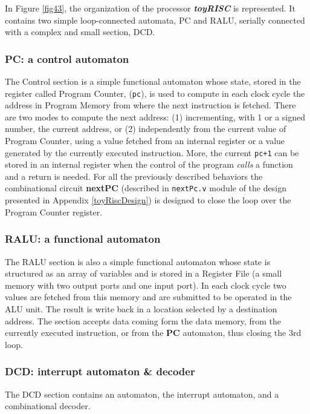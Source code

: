 In Figure \ref{fig43}, the organization of the processor {\bf {\em toyRISC}} is represented. It contains two simple loop-connected automata, PC and RALU, serially connected with a complex and small section, DCD.



\subsubsection{PC: a control automaton}

The Control section is a simple functional automaton whose
state, stored in the register called Program Counter, ({\tt pc}), is used
to compute in each clock cycle the address in Program Memory from where the next
instruction is fetched. There are two modes to compute the next
address: (1) incrementing, with 1 or a signed number, the current
address, or (2) independently from the
current value of Program Counter, using a value fetched from an internal
register or a value generated by the currently executed
instruction.  More,
the current {\tt pc+1} can be stored in an internal register when
the control of the program {\em calls} a  function and a return is
needed. For all the previously described behaviors the
combinational circuit {\bf nextPC} (described in {\tt nextPc.v} module of the design presented in Appendix \ref{toyRiscDesign}) is designed to close the loop over the Program Counter register.


\subsubsection{RALU: a functional automaton}

The RALU section is also a simple functional automaton whose state is structured as an array of variables and is stored in a Register File (a small memory with two output ports and one input port). In each clock cycle two values are fetched from this memory and are submitted to be operated in the ALU unit. The result is write back in a location selected by a destination address. The
section accepts data coming form the data memory,
from the currently executed instruction, or from the {\bf PC}
automaton, thus closing the 3rd loop.

\subsubsection{DCD: interrupt automaton \& decoder}\label{interrupt}

The DCD section contains an automaton, the interrupt automaton, and a combinational decoder.

